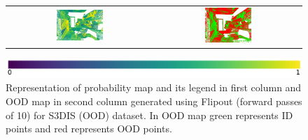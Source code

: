 \begin{figure}[h!]
\begin{tabular}{cc}
            \includegraphics[width=0.33\textwidth, height=0.18\textheight]{images/ood_imgs/fout_s3dis/ofc_42_fout_prob.pdf}& 
            \includegraphics[width=0.33\textwidth, height=0.18\textheight]{images/ood_imgs/fout_s3dis/fout_prob_1.pdf}\\
        \end{tabular}
        \includegraphics[scale=0.45]{images/prob_legend.pdf}
        \caption{Representation of probability map and its legend in first column and OOD map in second column generated using Flipout (forward passes of 10) for S3DIS (OOD) dataset. In OOD map green represents ID points and red represents OOD points.}
        \label{fig:fout_s3dis_oodmap_prob}
    \end{figure}


